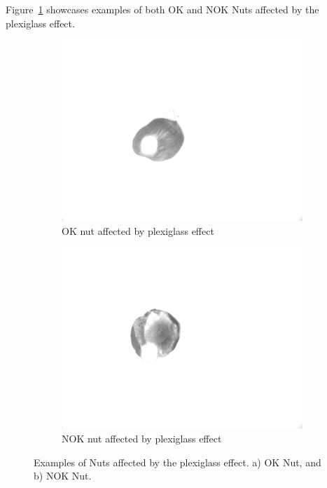 \documentclass[12pt,DIV14,BCOR12mm,a4paper,footinclude=false,headinclude,parskip=half-,twoside,openright,cleardoublepage=empty,toc=index,bibliography=totoc,listof=totoc]{scrreprt}
\numberwithin{equation}{chapter}
\begin{document}
\begin{enumerate}
	Figure~\ref{fig:plexiglass_effect} showcases examples of both OK and NOK Nuts affected by the plexiglass effect.

	\begin{figure}
		\centering
		\begin{subfigure}[b]{0.45\textwidth}
			\centering
			\includegraphics[scale=0.15]{../media/Nuts-influence-plexiglas-OK.png}
			\caption{OK nut affected by plexiglass effect}
		\end{subfigure}
		\hfill
		\begin{subfigure}[b]{0.45\textwidth}
			\centering
			\includegraphics[scale=0.15]{../media/Nuts-influence-plexiglas-NOK.png}
			\caption{NOK nut affected by plexiglass effect}
		\end{subfigure}
		\caption{Examples of Nuts affected by the plexiglass effect. a) OK Nut, and b) NOK Nut.}
		\label{fig:plexiglass_effect}
	\end{figure}
\end{enumerate}
\end{document}

